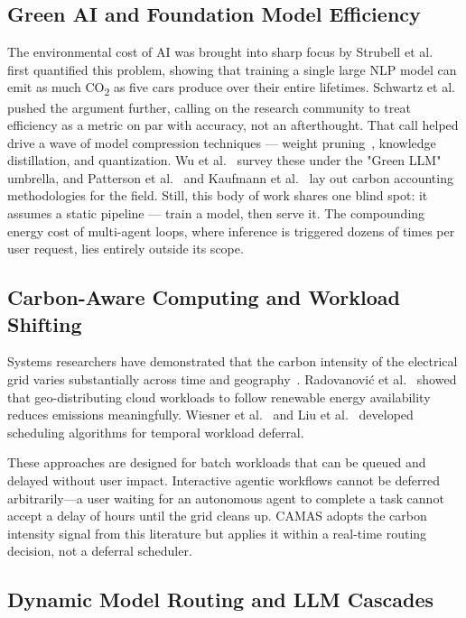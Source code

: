 \documentclass[journal]{IEEEtran}
\begin{document}
\subsection{Green AI and Foundation Model Efficiency}

The environmental cost of AI was brought into sharp focus by
Strubell et al.~\cite{strubell2019energy} first quantified this problem, showing that training a single large NLP model can emit as much CO\textsubscript{2} as five cars produce over their entire lifetimes. Schwartz et al.~\cite{schwartz2020green} pushed the argument further, calling on the research community to treat efficiency as a metric on par with accuracy, not an afterthought. That call helped drive a wave of model compression techniques — weight pruning~\cite{han2016deep}, knowledge distillation, and quantization. Wu et al.~\cite{wu2024green} survey these under the "Green LLM" umbrella, and Patterson et al.~\cite{patterson2021carbon} and Kaufmann et al.~\cite{kaufmann2023carbon} lay out carbon accounting methodologies for the field.
Still, this body of work shares one blind spot: it assumes a static pipeline — train a model, then serve it. The compounding energy cost of
multi-agent loops, where inference is triggered dozens of times per user
request, lies entirely outside its scope.

\subsection{Carbon-Aware Computing and Workload Shifting}

Systems researchers have demonstrated that the carbon intensity of the
electrical grid varies substantially across time and
geography~\cite{masanet2020recalibrating}. Radovanovi\'c et
al.~\cite{radovanovic2022carbon} showed that geo-distributing cloud workloads
to follow renewable energy availability reduces emissions meaningfully.
Wiesner et al.~\cite{wiesner2021lets} and Liu et al.~\cite{liu2023carbon}
developed scheduling algorithms for temporal workload deferral.

These approaches are designed for batch workloads that can be queued and
delayed without user impact. Interactive agentic workflows cannot be deferred
arbitrarily—a user waiting for an autonomous agent to complete a task cannot
accept a delay of hours until the grid cleans up. CAMAS adopts the carbon
intensity signal from this literature but applies it within a real-time
routing decision, not a deferral scheduler.

\subsection{Dynamic Model Routing and LLM Cascades}
\end{document}
